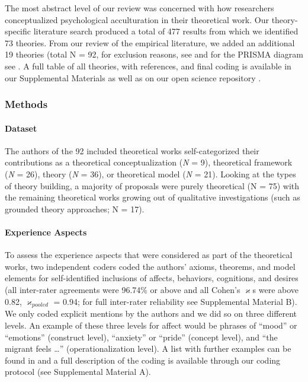 The most abstract level of our review was concerned with how researchers
conceptualized psychological acculturation in their theoretical work.
Our theory-specific literature search produced a total of 477 results
from which we identified 73 theories. From our review of the empirical
literature, we added an additional 19 theories (total N = 92, for
exclusion reasons, see  and for the
PRISMA diagram see . A full table of all
theories, with references, and final coding is available in our
Supplemental Materials as well as on our open science repository
\citep[see][]{Kreienkamp2021d, Kreienkamp2021e}.



\subsubsection{Methods}
\paragraph{Dataset}

The authors of the 92 included theoretical works self-categorized their
contributions as a theoretical conceptualization (\textit{N} = 9),
theoretical framework (\textit{N} = 26), theory (\textit{N} = 36), or
theoretical model (\textit{N} = 21). Looking at the types of theory
building, a majority of proposals were purely theoretical (N = 75) with
the remaining theoretical works growing out of qualitative
investigations (such as grounded theory approaches; N = 17).

\paragraph{Experience Aspects}

To assess the experience aspects that were considered as part of the
theoretical works, two independent coders coded the authors' axioms,
theorems, and model elements for self-identified inclusions of affects,
behaviors, cognitions, and desires (all inter-rater agreements were
96.74\% or above and all Cohen's \(\varkappa\)s were above 0.82,
\(\varkappa_{pooled}\) = 0.94; for full inter-rater reliability see
Supplemental Material B). We only coded explicit mentions by the authors
and we did so on three different levels. An example of these three
levels for affect would be phrases of ``mood'' or ``emotions''
(construct level), ``anxiety'' or ``pride'' (concept level), and ``the
migrant feels \ldots{}'' (operationalization level). A list with further
examples can be found in  and a full
description of the coding is available through our coding protocol (see
Supplemental Material A).

